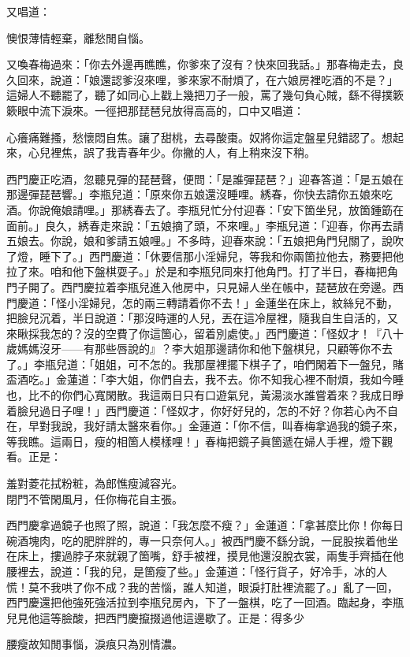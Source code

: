 又唱道：

\begin{myquote}
懊恨薄情輕棄，離愁閒自惱。
\end{myquote}

又喚春梅過來：「你去外邊再瞧瞧，你爹來了沒有？快來回我話。」那春梅走去，良久回來，說道：「娘還認爹沒來哩，爹來家不耐煩了，在六娘房裡吃酒的不是？」{}這婦人不聽罷了，聽了如同心上戳上幾把刀子一般，罵了幾句負心賊，繇不得撲簌簌眼中流下淚來。一徑把那琵琶兒放得高高的，口中又唱道：

\begin{myquote}
心癢痛難搔，愁懷悶自焦。讓了甜桃，去尋酸棗。奴將你這定盤星兒錯認了。想起來，心兒裡焦，誤了我青春年少。你撇的人，有上稍來沒下稍。
\end{myquote}

西門慶正吃酒，忽聽見彈的琵琶聲，便問：「是誰彈琵琶？」迎春答道：「是五娘在那邊彈琵琶響。」李瓶兒道：「原來你五娘還沒睡哩。綉春，你快去請你五娘來吃酒。你說俺娘請哩。」那綉春去了。李瓶兒忙分付迎春：「安下箇坐兒，放箇鍾筯在面前。」良久，綉春走來說：「五娘摘了頭，不來哩。」李瓶兒道：「迎春，你再去請五娘去。你說，娘和爹請五娘哩。」不多時，迎春來說：「五娘把角門兒關了，說吹了燈，睡下了。」西門慶道：「休要信那小淫婦兒，等我和你兩箇拉他去，務要把他拉了來。咱和他下盤棋耍子。」於是和李瓶兒同來打他角門。打了半日，春梅把角門子開了。西門慶拉着李瓶兒進入他房中，只見婦人坐在帳中，琵琶放在旁邊。西門慶道：「怪小淫婦兒，怎的兩三轉請着你不去！」金蓮坐在床上，紋絲兒不動，把臉兒沉着，半日說道：「那沒時運的人兒，丟在這冷屋裡，隨我自生自活的，又來瞅採我怎的？沒的空費了你這箇心，留着別處使。」{}西門慶道：「怪奴才！『八十歲媽媽沒牙——有那些唇說的』？李大姐那邊請你和他下盤棋兒，只顧等你不去了。」李瓶兒道：「姐姐，可不怎的。我那屋裡擺下棋子了，咱們閑着下一盤兒，賭盃酒吃。」金蓮道：「李大姐，你們自去，我不去。你不知我心裡不耐煩，我如今睡也，比不的你們心寬閑散。我這兩日只有口遊氣兒，黃湯淡水誰嘗着來？我成日睜着臉兒過日子哩！」{}西門慶道：「怪奴才，你好好兒的，怎的不好？你若心內不自在，早對我說，我好請太醫來看你。」金蓮道：「你不信，叫春梅拿過我的鏡子來，等我瞧。這兩日，瘦的相箇人模樣哩！」春梅把鏡子眞箇遞在婦人手裡，燈下觀看。正是：

\begin{myquote}
羞對菱花拭粉粧，為郎憔瘦減容光。\\閉門不管閑風月，任你梅花自主張。
\end{myquote}

西門慶拿過鏡子也照了照，說道：「我怎麼不瘦？」金蓮道：「拿甚麼比你！你每日碗酒塊肉，吃的肥胖胖的，專一只奈何人。」被西門慶不繇分說，一屁股挨着他坐在床上，摟過脖子來就親了箇嘴，舒手被裡，摸見他還沒脫衣裳，兩隻手齊插在他腰裡去，說道：「我的兒，是箇瘦了些。」金蓮道：「怪行貨子，好冷手，冰的人慌！莫不我哄了你不成？我的苦惱，誰人知道，眼淚打肚裡流罷了。」亂了一回，西門慶還把他強死強活拉到李瓶兒房內，下了一盤棋，吃了一回酒。臨起身，李瓶兒見他這等臉酸，把西門慶攛掇過他這邊歇了。正是：得多少

\begin{myquote}
腰瘦故知閒事惱，淚痕只為別情濃。
\end{myquote}


